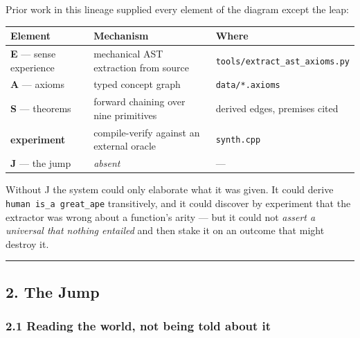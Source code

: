 \documentclass[
  11pt,
  a4paper,
]{article}
\begin{document}
Prior work in this lineage supplied every element of the diagram except
the leap:

\begin{longtable}[]{@{}
  >{\raggedright\arraybackslash}p{}
  >{\raggedright\arraybackslash}p{}
  >{\raggedright\arraybackslash}p{}@{}}
\toprule\noalign{}
\begin{minipage}[b]{\linewidth}\raggedright
Element
\end{minipage} & \begin{minipage}[b]{\linewidth}\raggedright
Mechanism
\end{minipage} & \begin{minipage}[b]{\linewidth}\raggedright
Where
\end{minipage} \\
\midrule\noalign{}
\endhead
\bottomrule\noalign{}
\endlastfoot
\textbf{E} --- sense experience & mechanical AST extraction from source
& \texttt{tools/extract\_ast\_axioms.py} \\
\textbf{A} --- axioms & typed concept graph & \texttt{data/*.axioms} \\
\textbf{S} --- theorems & forward chaining over nine primitives & 100
derived edges, premises cited \\
\textbf{experiment} & compile-verify against an external oracle &
\texttt{synth.cpp} \\
\textbf{J} --- the jump & \emph{absent} & --- \\
\end{longtable}

Without J the system could only elaborate what it was given. It could
derive \texttt{human\ is\_a\ great\_ape} transitively, and it could
discover by experiment that the extractor was wrong about a function's
arity --- but it could not \emph{assert a universal that nothing
entailed} and then stake it on an outcome that might destroy it.

\begin{center}\rule{0.5\linewidth}{0.5pt}\end{center}

\subsection{2. The Jump}\label{the-jump}

\subsubsection{2.1 Reading the world, not being told about
it}\label{reading-the-world-not-being-told-about-it}
\end{document}

